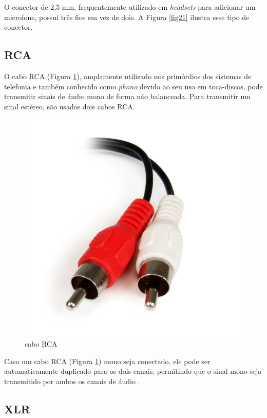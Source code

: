 O conector de 2,5 mm, frequentemente utilizado em \textit{headsets} para adicionar um microfone, possui três fios em vez de dois. A Figura \ref{fig21} ilustra esse tipo de conector.

\subsection{RCA}

O cabo RCA (Figura \ref{fig22}), amplamente utilizado nos primórdios dos sistemas de telefonia e também conhecido como \textit{phono} devido ao seu uso em toca-discos, pode transmitir sinais de áudio mono de forma não balanceada. Para transmitir um sinal estéreo, são usados dois cabos RCA.

\begin{figure}[h]
	\centering
    \includegraphics[scale=0.1]{figuras/fig22.png}
	\caption{cabo RCA \cite{rs}}
	\label{fig22}
\end{figure}

Caso um cabo RCA (Figura \ref{fig22}) mono seja conectado, ele pode ser automaticamente duplicado para os dois canais, permitindo que o sinal mono seja transmitido por ambos os canais de áudio \cite{bartlett}.

\subsection{XLR}

